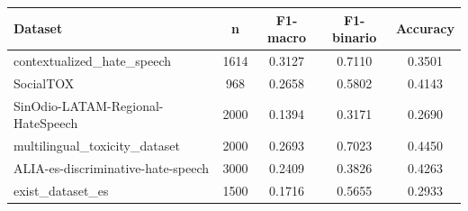 \begin{tabular}{lcccc}
\toprule
Dataset & n & F1-macro & F1-binario & Accuracy \\
\midrule
contextualized\_hate\_speech & 1614 & 0.3127 & 0.7110 & 0.3501 \\
SocialTOX & 968 & 0.2658 & 0.5802 & 0.4143 \\
SinOdio-LATAM-Regional-HateSpeech & 2000 & 0.1394 & 0.3171 & 0.2690 \\
multilingual\_toxicity\_dataset & 2000 & 0.2693 & 0.7023 & 0.4450 \\
ALIA-es-discriminative-hate-speech & 3000 & 0.2409 & 0.3826 & 0.4263 \\
exist\_dataset\_es & 1500 & 0.1716 & 0.5655 & 0.2933 \\
\bottomrule
\end{tabular}
